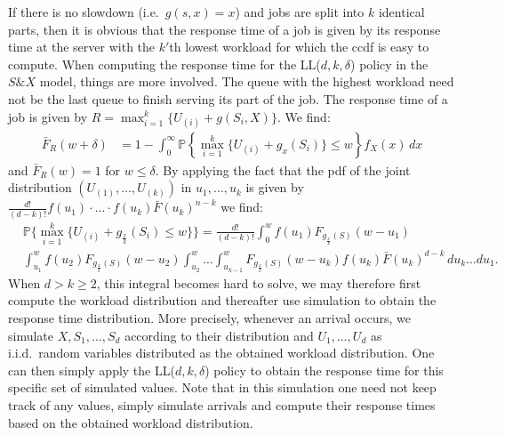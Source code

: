 \documentclass[12pt]{report}
\renewcommand{\P}{\mathbb{P}}
\renewcommand{\P}{\mathbb{P}}
\begin{document}
If there is no slowdown (i.e.~$g(s,x)=x$) and jobs are split into $k$ identical parts, then it is obvious that the response time of a job is given by its response time at the server with the $k'$th lowest workload for which the ccdf is easy to compute.
When computing the response time for the LL($d,k,\delta$) policy in the $S\&X$ model, things are more involved. The queue with the highest workload need not be the last queue to finish serving its part of the job. The response time of a job is given by $R=\max_{i=1}^k \{U_{(i)}+g(S_i,X)\}$. We find:
\begin{align*}
\bar F_R(w+\delta)
&= 1-\int_0^\infty \P\left\{ \max_{i=1}^k\{ U_{(i)}+g_{x}(S_i)\} \leq w \right\} f_X(x)\, dx
\end{align*}
and $\bar F_R(w)=1$ for $w \leq \delta$. By applying the fact that the pdf of the joint distribution $(U_{(1)},\dots, U_{(k)})$ in $u_1,\dots, u_k$ is given by $\frac{d!}{(d-k)!}f(u_1)\cdot \dots \cdot f(u_k) \bar F(u_k)^{n-k}$ we find:
\begin{align}
&\P\{\max_{i=1}^k\{U_{(i)}+g_{\frac{x}{k}}(S_i) \leq w\} \}= \frac{d!}{(d-k)!} \int_0^w f(u_1) F_{g_{\frac{x}{k}}(S)}(w-u_1)\nonumber\\
&\int_{u_1}^w f(u_2) F_{g_{\frac{x}{k}}(S)}(w-u_2) \int_{u_2}^w \dots \int_{u_{k-1}}^w F_{g_{\frac{x}{k}}(S)}(w-u_k) f(u_k) \bar F(u_k)^{d-k} \, du_k \dots du_1.
\end{align}
When $d>k\geq 2$, this integral becomes hard to solve, we may therefore first compute the workload distribution and thereafter use simulation to obtain the response time distribution. More
precisely, whenever an arrival occurs, we simulate $X,S_1,\dots,S_d$ according to their distribution and $U_1,\dots,U_d$ as i.i.d.~random variables distributed as the obtained workload distribution. One can then simply apply the LL($d,k,\delta$) policy to obtain the response time for this specific set of simulated values. Note that in this simulation one need not keep track of any values, simply simulate arrivals and compute their response times based on the obtained workload distribution.
\end{document}
